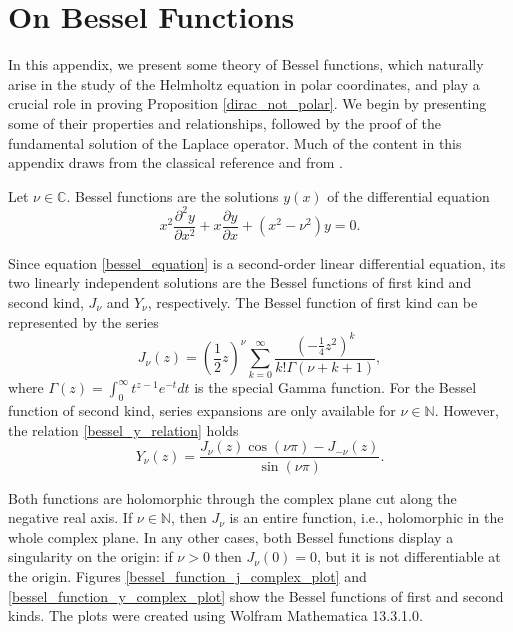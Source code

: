 \chapter{On Bessel Functions}\label{appendix_c_bessel}

In this appendix, we present some theory of Bessel functions, which naturally arise in the study of the Helmholtz equation in polar coordinates, and play a crucial role in proving Proposition \ref{dirac_not_polar}. We begin by presenting some of their properties and relationships, followed by the proof of the fundamental solution of the Laplace operator. Much of the content in this appendix draws from the classical reference \cite{abramowitz1988handbook} and from \cite{chen2010boundary}.

Let \(\nu \in \mathbb{C}\). Bessel functions are the solutions \(y(x)\) of the differential equation
\begin{equation}\label{bessel_equation}
    x^2\frac{\partial^2 y}{\partial x^2} + x \frac{\partial y}{\partial x} + (x^2-\nu^2)y = 0.
\end{equation}

Since equation \eqref{bessel_equation} is a second-order linear differential equation, its two linearly independent solutions are the Bessel functions of first kind and second kind, \(J_\nu\) and \(Y_\nu\), respectively. The Bessel function of first kind can be represented by the series
\[
    J_\nu (z) = \left(\frac{1}{2}z\right)^\nu \sum_{k=0}^{\infty} \frac{\left(-\frac{1}{4}z^2\right)^k}{k! \Gamma(\nu+k+1)},
\]
where \(\Gamma(z) = \int_0^\infty t^{z-1} e^{-t}dt\) is the special Gamma function. For the Bessel function of second kind, series expansions are only available for \(\nu \in \mathbb{N}\). However, the relation \eqref{bessel_y_relation} holds
\begin{equation}\label{bessel_y_relation}
    Y_\nu(z) = \frac{J_\nu(z) \cos(\nu \pi) - J_{-\nu}(z)}{\sin(\nu \pi)}.
\end{equation}

Both functions are holomorphic through the complex plane cut along the negative real axis. If \(\nu \in \mathbb{N}\), then \(J_\nu\) is an entire function, i.e., holomorphic in the whole complex plane. In any other cases, both Bessel functions display a singularity on the origin: if \(\nu > 0\) then \(J_\nu(0)=0\), but it is not differentiable at the origin. Figures \ref{bessel_function_j_complex_plot} and \ref{bessel_function_y_complex_plot} show the Bessel functions of first and second kinds. The plots were created using Wolfram Mathematica 13.3.1.0.

